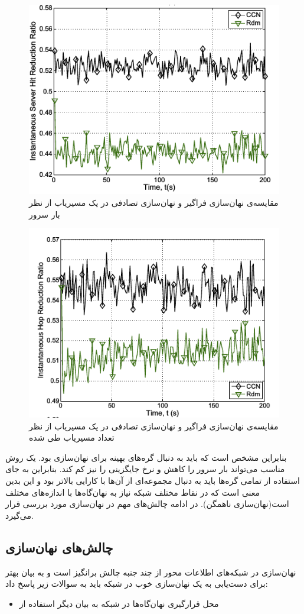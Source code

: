 \begin{figure}[t]
	\centering
	\includegraphics[scale=0.5]{cl4m-server}
	\caption{مقایسه‌ی نهان‌سازی فراگیر و نهان‌سازی تصادفی در یک مسیریاب از نظر بار سرور}
	\label{fig:cl4m-server}
\end{figure}


\begin{figure}[t]
	\centering
	\includegraphics[scale=0.5]{cl4m-hop} 
	\caption{مقایسه‌ی نهان‌سازی فراگیر و نهان‌سازی تصادفی در یک مسیریاب از نظر تعداد مسیریاب طی شده}
	\label{fig:cl4m-hop}
\end{figure}

بنابراین مشخص است که باید به دنبال گره‌های بهینه برای نهان‌سازی بود. یک روش مناسب می‌تواند بار سرور را کاهش و نرخ جایگزینی را نیز کم کند. بنابراین به جای استفاده از تمامی گره‌ها باید به دنبال مجموعه‌ای از آن‌ها با کارایی بالاتر بود و این بدین معنی است که در نقاط مختلف شبکه نیاز به نهان‌گاه‌ها با اندازه‌های مختلف است(نهان‌سازی ناهمگن). در ادامه چالش‌های مهم در نهان‌سازی مورد بررسی قرار می‌گیرد.


\subsection{چالش‌های نهان‌سازی}

نهان‌سازی در شبکه‌های اطلاعات محور از چند جنبه چالش برانگیز است و به بیان بهتر برای دست‌یابی به یک نهان‌سازی خوب در شبکه باید به سوالات زیر پاسخ داد:

\begin{itemize}
	\item
	محل قرارگیری نهان‌گاه‌ها در شبکه به بیان دیگر استفاده از 
\end{itemize}





